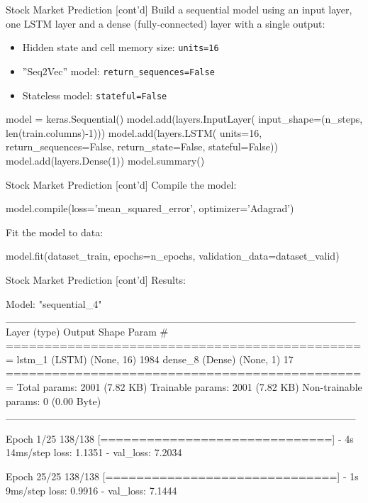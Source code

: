 \documentclass[ignorenonframetext,xcolor=x11names]{beamer}
\begin{document}
\begin{frame}[fragile]{Stock Market Prediction \small [cont'd]}
Build a sequential model using an input layer, one LSTM layer and a dense (fully-connected) layer with a single output:
\begin{itemize}
   \item Hidden state and cell memory size: \texttt{units=16}
   \item ''Seq2Vec'' model: \texttt{return\_sequences=False}
   \item Stateless model: \texttt{stateful=False}
\end{itemize}

\begin{pythoncode}
model = keras.Sequential()
model.add(layers.InputLayer(
    input_shape=(n_steps, len(train.columns)-1)))
model.add(layers.LSTM(
    units=16,
    return_sequences=False,
    return_state=False,
    stateful=False))
model.add(layers.Dense(1))
model.summary()
\end{pythoncode}
\end{frame} 

\begin{frame}[fragile]{Stock Market Prediction \small [cont'd]}
Compile the model:
\begin{pythoncode}
model.compile(loss='mean_squared_error', 
              optimizer='Adagrad')
\end{pythoncode}

Fit the model to data:
\begin{pythoncode}
model.fit(dataset_train, epochs=n_epochs, 
          validation_data=dataset_valid)
\end{pythoncode}
\end{frame}

\begin{frame}[fragile]{Stock Market Prediction \small [cont'd]}
Results:
\begin{textcode}
Model: "sequential_4"
_______________________________________________
 Layer (type)       Output Shape     Param #   
===============================================
 lstm_1 (LSTM)      (None, 16)       1984      
 dense_8 (Dense)    (None, 1)        17        
===============================================
Total params: 2001 (7.82 KB)
Trainable params: 2001 (7.82 KB)
Non-trainable params: 0 (0.00 Byte)
_______________________________________________

Epoch 1/25
138/138 [==============================] - 4s 14ms/step 
loss: 1.1351 - val_loss: 7.2034

Epoch 25/25
138/138 [==============================] - 1s 9ms/step
loss: 0.9916 - val_loss: 7.1444
\end{textcode}
\end{frame}
\end{document}
